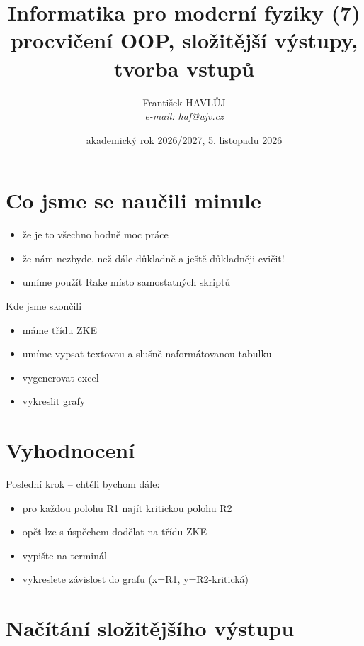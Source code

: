 \documentclass{beamer}
\title[IMF (7)]{Informatika pro moderní fyziky (7)\\procvičení OOP, složitější výstupy, tvorba vstupů}
\author[Franti\v{s}ek HAVL\r{U}J, ORF ÚJV Řež]{Franti\v{s}ek HAVL\r{U}J\\{\scriptsize \emph{e-mail: haf@ujv.cz}}}
\date{akademický rok 2026/2027, 5. listopadu 2026}
\institute[ORF ÚJV Řež]
{ÚJV Řež\\oddělení Reaktorové fyziky a podpory palivového cyklu}
\begin{document}
\begin{frame}
  \titlepage
\end{frame}

\begin{frame}
  \tableofcontents
\end{frame}

\section{Co jsme se naučili minule}

\begin{frame}{}
  \begin{itemize}
    \item že je to všechno hodně moc práce
    \item že nám nezbyde, než dále důkladně a ještě důkladněji cvičit! 
    \item umíme použít Rake místo samostatných skriptů 
  \end{itemize}
\end{frame}

\begin{frame}{Kde jsme skončili}
  \begin{itemize}
    \item máme třídu ZKE
    \item umíme vypsat textovou a slušně naformátovanou tabulku 
    \item vygenerovat excel
    \item vykreslit grafy  
  \end{itemize}
\end{frame}

\section{Vyhodnocení}

\begin{frame}
  Poslední krok -- chtěli bychom dále:
  \begin{itemize}
    \item pro každou polohu R1 najít kritickou polohu R2
    \item opět lze s úspěchem dodělat na třídu ZKE
    \item vypište na terminál
    \item vykreslete závislost do grafu (x=R1, y=R2-kritická)   
  \end{itemize}
\end{frame}

\section{Načítání složitějšího výstupu}
\end{document}
